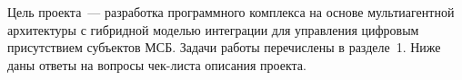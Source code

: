 \Introduction

Цель проекта~--- разработка программного комплекса на основе мультиагентной архитектуры с гибридной моделью интеграции для управления цифровым присутствием субъектов МСБ. Задачи работы перечислены в разделе~1. Ниже даны ответы на вопросы чек-листа описания проекта.
